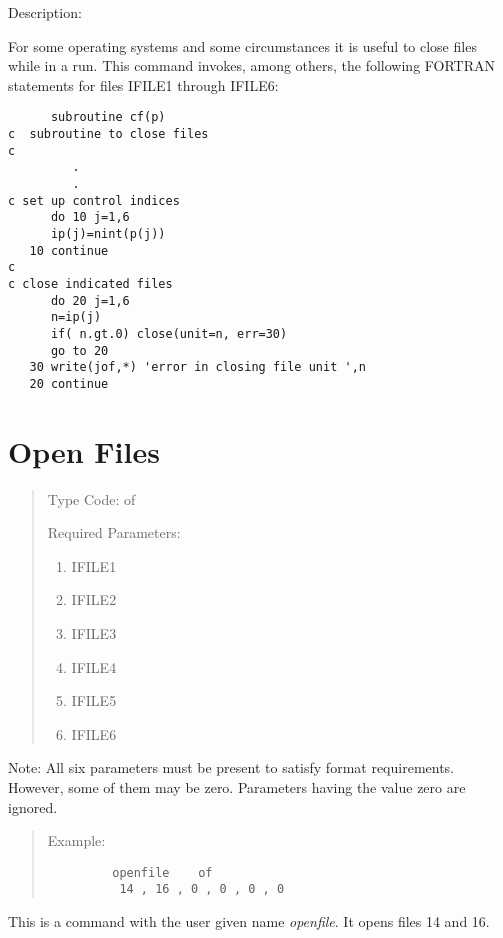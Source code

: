 \vspace{5mm}
     Description:
\vspace{2mm}

For some operating systems and some circumstances it is useful to close files while in a \Mary run.  This command invokes, among others, the following FORTRAN statements for files IFILE1
through IFILE6:
\begin{footnotesize}
\begin{verbatim}
      subroutine cf(p)
c  subroutine to close files
c
         .
         .
c set up control indices
      do 10 j=1,6
      ip(j)=nint(p(j))
   10 continue
c
c close indicated files
      do 20 j=1,6
      n=ip(j)
      if( n.gt.0) close(unit=n, err=30)
      go to 20
   30 write(jof,*) 'error in closing file unit ',n
   20 continue
\end{verbatim}
\end{footnotesize}

\newpage
\section{Open Files}
\begin{quotation}
\noindent Type Code:  of 
\vspace{5mm}

\noindent Required Parameters:
\begin{enumerate}
      \item  IFILE1
      \item  IFILE2
      \item  IFILE3
      \item  IFILE4
      \item  IFILE5
      \item  IFILE6
\end{enumerate}
\end{quotation}
Note:  All six parameters must be present to satisfy format requirements.
However, some of them may be zero.  Parameters having the value zero are
ignored.

\begin{quotation}
\vspace{5mm}
\noindent     Example:
\begin{verbatim}
         openfile    of
          14 , 16 , 0 , 0 , 0 , 0
\end{verbatim}
\end{quotation}
This is a command with the user given name {\em openfile}.  It opens files 14 and 16.

